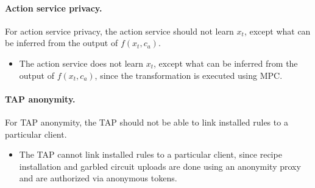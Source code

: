 \paragraph{Action service privacy.} For action service privacy, the action
service should not learn $x_t$, except what can be inferred from the output of
$f(x_t, c_a)$.
\begin{itemize}
  \item The action service does not learn $x_t$, except what can be inferred
    from the output of $f(x_t, c_a)$, since the transformation is executed using
    MPC.
\end{itemize}

\paragraph{TAP anonymity.} For TAP anonymity, the TAP should not be able to link
installed rules to a particular client.
\begin{itemize}
  \item The TAP cannot link installed rules to a particular client, since recipe
    installation and garbled circuit uploads are done using an anonymity proxy
    and are authorized via anonymous tokens.
\end{itemize}

